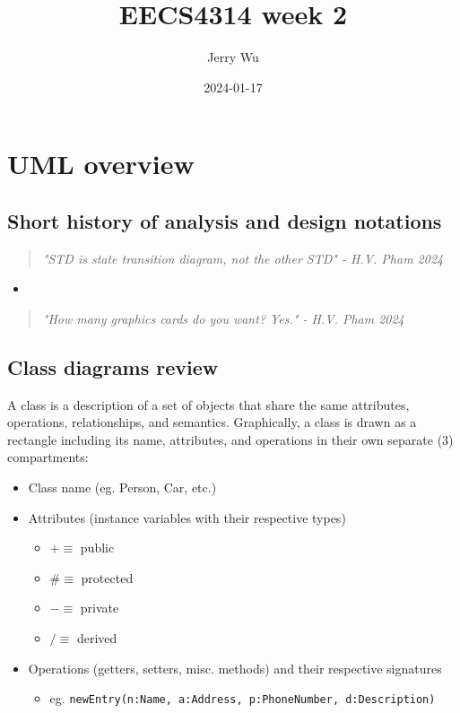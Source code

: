 \documentclass[12pt]{book}
\title{EECS4314 week 2}
\author{Jerry Wu}
\date{2024-01-17}
\begin{document}
\maketitle
\tableofcontents

\chapter{UML overview}

\section*{Short history of analysis and design notations}

\begin{quote}
    \textit{"STD is state transition diagram, not the other STD" - H.V. Pham 2024}
\end{quote}

\begin{itemize}
    \item 
\end{itemize}

\begin{quote}
    \textit{"How many graphics cards do you want? Yes." - H.V. Pham 2024}
\end{quote}




\section*{Class diagrams review}
A class is a description of a set of objects that share the same attributes, operations, relationships, and semantics. Graphically, a class is drawn as a rectangle including its name, attributes, and operations in their own separate (3) compartments:

\begin{itemize}
    \item Class name (eg. Person, Car, etc.)
    
    \item Attributes (instance variables with their respective types)
    \begin{itemize}
        \item[] $+\equiv$ public
        \item[] $\#\equiv$ protected
        \item[] $-\equiv$ private
        \item[] $/\equiv$ derived
    \end{itemize} 

    \item Operations (getters, setters, misc. methods) and their respective signatures
    \begin{itemize}
        \item eg. \texttt{newEntry(n:Name, a:Address, p:PhoneNumber, d:Description)}
    \end{itemize}

\end{itemize}
\end{document}
